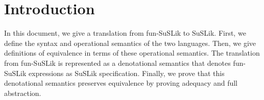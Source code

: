 \documentclass[10pt]{article}
\newcommand{\sem} [1] {\llbracket#1\rrbracket}
\newcommand{\Gsem} [1] {\mathcal{G}\sem{#1}}
\newcommand{\Ssem} [1] {\mathcal{S}\sem{#1}}
\begin{document}
\section{Introduction}

In this document, we give a translation from fun-SuSLik to SuSLik. First, we define the syntax and
operational semantics of the two languages. Then, we give definitions of equivalence in terms of these
operational semantics. The translation from fun-SuSLik is represented as a denotational semantics
that denotes fun-SuSLik expressions as SuSLik specification. Finally, we prove that this denotational
semantics preserves equivalence by proving adequacy and full abstraction.


%
%
%
%
%
%
%
\end{document}
